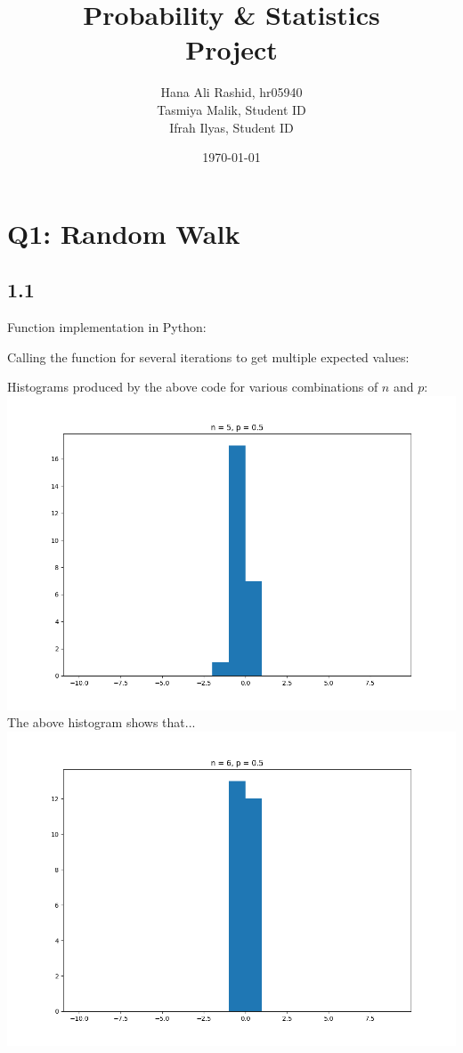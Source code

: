 \documentclass[answers]{exam}
\title{Probability \& Statistics\\ Project}
\author{Hana Ali Rashid, hr05940\\ Tasmiya Malik, Student ID\\ Ifrah Ilyas, Student ID}
\date{\today{}}
\begin{document}
\maketitle



\section*{Q1: Random Walk}
\subsection*{1.1}
Function implementation in Python:

Calling the function for several iterations to get multiple expected values:

\pagebreak
Histograms produced by the above code for various combinations of $n$ and $p$:\\
\includegraphics[scale = 0.7]{Q1_histograms/q1n = 5, p = 0.5.png}\\
The above histogram shows that...\\
\includegraphics[scale = 0.7]{Q1_histograms/q1n = 6, p = 0.5.png}\\
\end{document}
